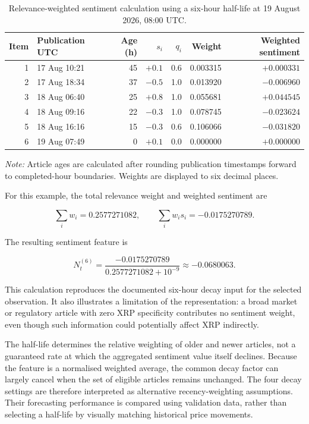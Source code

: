 \begin{table}[htbp]
\centering
\small
\caption{Relevance-weighted sentiment calculation using a six-hour half-life at 19 August 2026, 08:00 UTC.}
\label{tab:actualdecay}
\begin{tabular}{rlrrrrr}
\toprule
Item & Publication UTC & Age (h) & $s_i$ & $q_i$ & Weight & Weighted sentiment \\
\midrule
1 & 17 Aug 10:21 & 45 & $+0.1$ & 0.6 & 0.003315 & $+0.000331$ \\
2 & 17 Aug 18:34 & 37 & $-0.5$ & 1.0 & 0.013920 & $-0.006960$ \\
3 & 18 Aug 06:40 & 25 & $+0.8$ & 1.0 & 0.055681 & $+0.044545$ \\
4 & 18 Aug 09:16 & 22 & $-0.3$ & 1.0 & 0.078745 & $-0.023624$ \\
5 & 18 Aug 16:16 & 15 & $-0.3$ & 0.6 & 0.106066 & $-0.031820$ \\
6 & 19 Aug 07:49 & 0 & $+0.1$ & 0.0 & 0.000000 & $+0.000000$ \\
\bottomrule
\end{tabular}

\par\footnotesize\emph{Note:} Article ages are calculated after rounding publication timestamps forward to completed-hour boundaries. Weights are displayed to six decimal places.
\end{table}

For this example, the total relevance weight and weighted sentiment are

\begin{equation}
\sum_i w_i=0.2577271082,
\qquad
\sum_i w_is_i=-0.0175270789.
\label{eq:decay_example_sums}
\end{equation}

The resulting sentiment feature is

\begin{equation}
N_t^{(6)}
=
\frac{-0.0175270789}
{0.2577271082+10^{-9}}
\approx -0.0680063.
\label{eq:decay_example}
\end{equation}

This calculation reproduces the documented six-hour decay input for the selected observation. It also illustrates a limitation of the representation: a broad market or regulatory article with zero XRP specificity contributes no sentiment weight, even though such information could potentially affect XRP indirectly.

The half-life determines the relative weighting of older and newer articles, not a guaranteed rate at which the aggregated sentiment value itself declines. Because the feature is a normalised weighted average, the common decay factor can largely cancel when the set of eligible articles remains unchanged. The four decay settings are therefore interpreted as alternative recency-weighting assumptions. Their forecasting performance is compared using validation data, rather than selecting a half-life by visually matching historical price movements.

